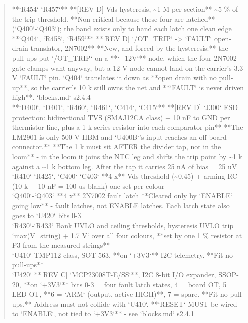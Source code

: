 \documentclass[11pt,a4paper]{article}
\begin{document}
\begin{quote}
\textbar{} {*}{*}`R454`-`R457`{*}{*} \textbar{} {*}{*}{[}REV D{]} Vds hysteresis, \textasciitilde{}1 M per section{*}{*} \textbar{} \textasciitilde{}5 \% of the trip threshold. {*}{*}Non-critical because these four are latched{*}{*} (`Q400`-`Q403`); the band exists only to hand each latch one clean edge \textbar{}\\
\textbar{} {*}{*}`Q404`, `R458`, `R459`{*}{*} \textbar{} {*}{*}{[}REV D{]} `/OT\_TRIP` -\textgreater{} `FAULT` open-drain translator, 2N7002{*}{*} \textbar{} {*}{*}New, and forced by the hysteresis:{*}{*} the pull-ups put `/OT\_TRIP` on a {*}{*}`+12V`{*}{*} node, which the four 2N7002 gate clamps want anyway, but a 12 V node cannot land on the carrier's 3.3 V `FAULT` pin. `Q404` translates it down as {*}{*}open drain with no pull-up{*}{*}, so the carrier's 10 k still owns the net and {*}{*}`FAULT` is never driven high{*}{*}. `blocks.md` s2.4.4 \textbar{}\\
\textbar{} {*}{*}`D400`, `D401`, `R460`, `R461`, `C414`, `C415`{*}{*} \textbar{} {*}{*}{[}REV D{]} `J300` ESD protection: bidirectional TVS (SMAJ12CA class) + 10 nF to GND per thermistor line, plus a 1 k series resistor into each comparator pin{*}{*} \textbar{} {*}{*}The LM2901 is only 500 V HBM and `U400B`'s input reaches an off-board connector.{*}{*} {*}{*}The 1 k must sit AFTER the divider tap, not in the loom{*}{*} - in the loom it joins the NTC leg and shifts the trip point by \textasciitilde{}1 k against a \textasciitilde{}1 k bottom leg. After the tap it carries 25 nA of bias = 25 uV \textbar{}\\
\textbar{} `R410`-`R425`, `C400`-`C403` \textbar{} {*}{*}4 x{*}{*} Vds threshold (\textasciitilde{}0.45) + arming RC (10 k + 10 nF = 100 us blank) \textbar{} one set per colour \textbar{}\\
\textbar{} `Q400`-`Q403` \textbar{} {*}{*}4 x{*}{*} 2N7002 fault latch \textbar{} {*}{*}Cleared only by `ENABLE` going low{*}{*} - fault latches, not ENABLE latches. Each latch state also goes to `U420` bits 0-3 \textbar{}\\
\textbar{} `R430`-`R433` \textbar{} Bank UVLO and ceiling thresholds, hysteresis \textbar{} UVLO trip = `max(V\_string) + 1.7 V` over all four colours, {*}{*}set by one 1 \% resistor at P3 from the measured strings{*}{*} \textbar{}\\
\textbar{} `U410` \textbar{} TMP112 class, SOT-563, {*}{*}on `+3V3`{*}{*} \textbar{} I2C telemetry. {*}{*}Fit no pull-ups{*}{*} \textbar{}\\
\textbar{} `U420` \textbar{} {*}{*}{[}REV C{]} `MCP23008T-E/SS`{*}{*}, I2C 8-bit I/O expander, SSOP-20, {*}{*}on `+3V3`{*}{*} \textbar{} bits 0-3 = four fault latch states, 4 = board OT, 5 = LED OT, {*}{*}6 = `ARM` (output, active HIGH){*}{*}, 7 = spare. {*}{*}Fit no pull-ups.{*}{*} Address must not collide with `U410`. {*}{*}`RESET` MUST be wired to `ENABLE`, not tied to `+3V3`{*}{*} - see `blocks.md` s2.4.1 \textbar{}\\

\end{quote}
\end{document}
